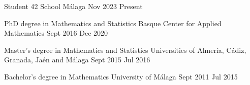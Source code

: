 
		\nopagebreak	
		\begin{education} 
			{Student}
			{42 School Málaga}
			{Nov 2023}
			{Present}
		\end{education}

		\begin{education} 
			{PhD degree in Mathematics and Statistics}
			{Basque Center for Applied Mathematics}
			{Sept 2016}
			{Dec 2020}
		\end{education}

		\begin{education} 
			{Master's degree in Mathematics and Statistics}
			{Universities of Almer\'ia, C\'adiz, Granada, Ja\'en and M\'alaga}
			{Sept 2015}
			{Jul 2016}
		\end{education}

		\begin{firsteducation} 
			{Bachelor's degree in Mathematics}
			{University of M\'alaga}
			{Sept 2011}
			{Jul 2015}
		\end{firsteducation}
